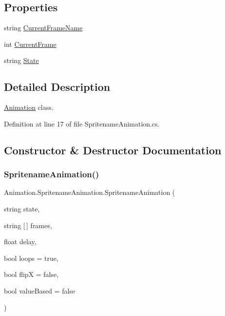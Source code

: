 \subsection*{Properties}
\begin{DoxyCompactItemize}
\item 
string \hyperlink{class_animation_1_1_spritename_animation_af26dab62d982359259d848ab4d7b508e}{Current\+Frame\+Name}
\item 
int \hyperlink{class_animation_1_1_spritename_animation_ab3e5f4b8247f9e1326ff411271819f2c}{Current\+Frame}
\item 
string \hyperlink{class_animation_1_1_spritename_animation_aecae671061e80c3ac38bae5a47be754c}{State}
\end{DoxyCompactItemize}


\subsection{Detailed Description}
\hyperlink{namespace_animation}{Animation} class. 



Definition at line 17 of file Spritename\+Animation.\+cs.



\subsection{Constructor \& Destructor Documentation}
\mbox{\label{class_animation_1_1_spritename_animation_a7190ea75bd48e32fc9f844f8a658f81c}} 
\subsubsection{\texorpdfstring{Spritename\+Animation()}{SpritenameAnimation()}}
{\footnotesize\ttfamily Animation.\+Spritename\+Animation.\+Spritename\+Animation (\begin{DoxyParamCaption}\item[{string}]{state,  }\item[{string \mbox{[}$\,$\mbox{]}}]{frames,  }\item[{float}]{delay,  }\item[{bool}]{loops = {\ttfamily true},  }\item[{bool}]{flipX = {\ttfamily false},  }\item[{bool}]{value\+Based = {\ttfamily false} }\end{DoxyParamCaption})}



